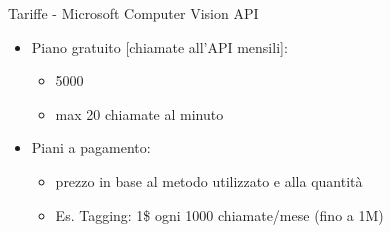%
\begin{frame}[t]{Tariffe - Microsoft Computer Vision API}
	\begin{itemize}
		\item Piano gratuito [chiamate all'API mensili]:
		\begin{itemize}
			\item 5000
			\item max 20 chiamate al minuto
		\end{itemize}
		\item Piani a pagamento:
		\begin{itemize}
			\item prezzo in base al metodo utilizzato e alla quantità
			\item Es. Tagging: 1\$ ogni 1000 chiamate/mese (fino a 1M)
		\end{itemize}
	\end{itemize}
\end{frame}
%
